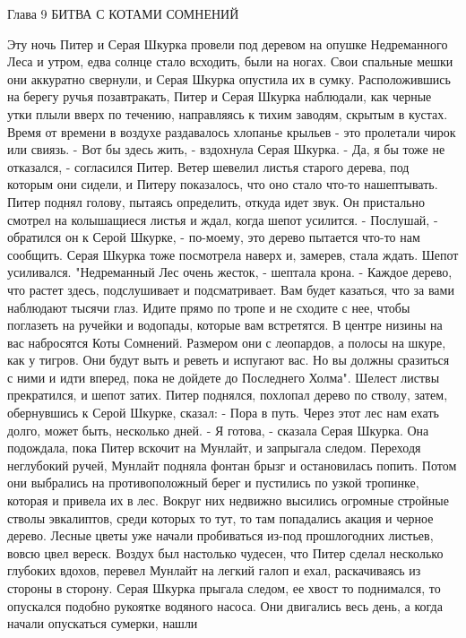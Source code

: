 Глава 9
        БИТВА С КОТАМИ СОМНЕНИЙ

    Эту ночь Питер и Серая Шкурка провели под деревом на опушке 
Недреманного Леса и утром, едва солнце стало всходить, были на ногах. 
Свои спальные мешки они аккуратно свернули, и Серая Шкурка опустила их 
в сумку. Расположившись на берегу ручья позавтракать, Питер и Серая 
Шкурка наблюдали, как черные утки плыли вверх по течению, направляясь 
к тихим заводям, скрытым в кустах. Время от времени в воздухе 
раздавалось хлопанье крыльев - это пролетали чирок или свиязь.
    - Вот бы здесь жить, - вздохнула Серая Шкурка.
    - Да, я бы тоже не отказался, - согласился Питер.
    Ветер шевелил листья старого дерева, под которым они сидели, и 
Питеру показалось, что оно стало что-то нашептывать. Питер поднял 
голову, пытаясь определить, откуда идет звук. Он пристально смотрел на 
колышащиеся листья и ждал, когда шепот усилится.
    - Послушай, - обратился он к Серой Шкурке, - по-моему, это дерево 
пытается что-то нам сообщить.
    Серая Шкурка тоже посмотрела наверх и, замерев, стала ждать.
    Шепот усиливался.
    "Недреманный Лес очень жесток, - шептала крона. - Каждое дерево, 
что растет здесь, подслушивает и подсматривает. Вам будет казаться, 
что за вами наблюдают тысячи глаз. Идите прямо по тропе и не сходите с 
нее, чтобы поглазеть на ручейки и водопады, которые вам встретятся. В 
центре низины на вас набросятся Коты Сомнений. Размером они с 
леопардов, а полосы на шкуре, как у тигров. Они будут выть и реветь и 
испугают вас. Но вы должны сразиться с ними и идти вперед, пока не 
дойдете до Последнего Холма".
    Шелест листвы прекратился, и шепот затих. Питер поднялся, похлопал 
дерево по стволу, затем, обернувшись к Серой Шкурке, сказал:
    - Пора в путь. Через этот лес нам ехать долго, может быть, 
несколько дней.
    - Я готова, - сказала Серая Шкурка. Она подождала, пока Питер 
вскочит на Мунлайт, и запрыгала следом. Переходя неглубокий ручей, 
Мунлайт подняла фонтан брызг и остановилась попить. Потом они 
выбрались на противоположный берег и пустились по узкой тропинке, 
которая и привела их в лес.
    Вокруг них недвижно высились огромные стройные стволы эвкалиптов, 
среди которых то тут, то там попадались акация и черное дерево. Лесные 
цветы уже начали пробиваться из-под прошлогодних листьев, вовсю цвел 
вереск. Воздух был настолько чудесен, что Питер сделал несколько 
глубоких вдохов, перевел Мунлайт на легкий галоп и ехал, раскачиваясь 
из стороны в сторону. Серая Шкурка прыгала следом, ее хвост то 
поднимался, то опускался подобно рукоятке водяного насоса.
    Они двигались весь день, а когда начали опускаться сумерки, нашли 
